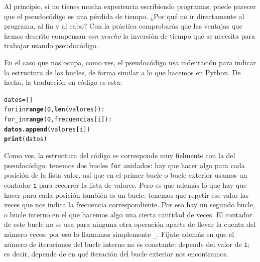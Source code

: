 \documentclass[10pt,a4paper]{article}\usepackage[]{graphicx}\usepackage[]{color}
\makeatletter
\newcommand{\hlkwd}[1]{\textcolor[rgb]{0.737,0.353,0.396}{\textbf{#1}}}%
\newenvironment{kframe}{%
 \def\at@end@of@kframe{}%
 \ifinner\ifhmode%
  \def\at@end@of@kframe{\end{minipage}}%
  \begin{minipage}{\columnwidth}%
 \fi\fi%
 \def\FrameCommand##1{\hskip\@totalleftmargin \hskip-\fboxsep
 \colorbox{shadecolor}{##1}\hskip-\fboxsep
     \hskip-\linewidth \hskip-\@totalleftmargin \hskip\columnwidth}%
 \MakeFramed {\advance\hsize-\width
   \@totalleftmargin\z@ \linewidth\hsize
   \@setminipage}}%
 {\par\unskip\endMakeFramed%
 \at@end@of@kframe}
\newenvironment{knitrout}{}{} %
\newcounter {cont01}
\makeatother
\begin{document}
Al principio, si no tienes mucha experiencia escribiendo programas, puede parecer que el pseudocódigo es una pérdida de tiempo. ¿Por qué no ir directamente al programa, al fin y al cabo? Con la práctica comprobarás que las ventajas que hemos descrito compensan {\em con mucho} la inversión de tiempo que se necesita para trabajar usando pseudocódigo.

En el caso que nos ocupa, como ves, el pseudocódigo usa indentación para indicar la estructura de los bucles, de forma similar a lo que hacemos en Python. De hecho, la traducción en código es esta:
\begin{knitrout}
\color{fgcolor}\begin{kframe}
\begin{alltt}
datos = []
for i in \hlkwd{range}(0, \hlkwd{len}(valores)):
  for _ in \hlkwd{range}(0, frecuencias[i]):
    \hlkwd{datos.append}(valores[i])
\hlkwd{print}(datos)
\end{alltt}
\end{kframe}
\end{knitrout}
Como ves, la estructura del código se corresponde muy fielmente con la del pseudocódigo: tenemos dos bucles {\tt for} anidados: hay que hacer algo para cada posición de la lista valor, así que en el primer bucle o {\sf bucle exterior}  usamos un contador {\tt i} para recorrer la lista de valores. Pero es que además lo que hay que hacer para cada posición también es un bucle: tenemos que repetir ese valor las veces que nos indica la frecuencia correspondiente. Por eso hay un {segundo bucle, o bucle interno} en el que hacemos algo una cierta cantidad de veces. El contador de este bucle no se usa para ninguna otra operación aparte de llevar la cuenta del número veces: por eso lo llamamos simplemente \verb&_&.  Fíjate además en que el número de iteraciones del bucle interno no es constante: depende del valor de {\tt i}; es decir, depende de en qué iteración del bucle exterior nos encontramos.
\end{document}

